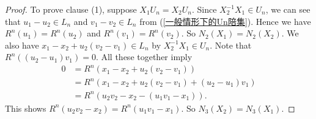 \documentclass[11pt]{amsart}
\theoremstyle{definition}
\theoremstyle{remark}
\numberwithin{equation}{section}
\begin{document}
\begin{proof}
To prove clause (1), suppose $X_1U_n=X_2U_n$. Since $X_2^{-1}X_1\in U_n$, we can see that $u_1-u_2\in L_n$ and $v_1-v_2\in L_n$ from (\ref{一般情形下的Un陪集}). Hence we have $R^n(u_1)=R^n(u_2)$ and $R^n(v_1)=R^n(v_2)$. So $N_2(X_1)=N_2(X_2)$. We also have $x_1-x_2+u_2(v_2-v_1)\in L_n$ by $X_2^{-1}X_1\in U_n$.
Note that $R^n((u_2-u_1)v_1)=0$. All these together imply
    \begin{align*}
        0&=R^n(x_1-x_2+u_2(v_2-v_1))\\
        &=R^n(x_1-x_2+u_2(v_2-v_1)+(u_2-u_1)v_1)\\
        &=R^n(u_2v_2-x_2-(u_1v_1-x_1)).
    \end{align*}
This shows $R^n(u_2v_2-x_2)=R^n(u_1v_1-x_1)$. So $N_3(X_2)=N_3(X_1)$.



\end{proof}
\end{document}
